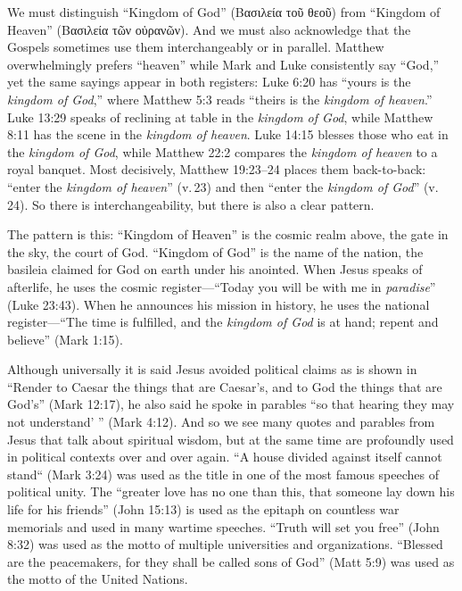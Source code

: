 We must distinguish ``Kingdom of God'' (Βασιλεία τοῦ θεοῦ) from ``Kingdom of Heaven'' (Βασιλεία τῶν οὐρανῶν).
And we must also acknowledge that the Gospels sometimes use them interchangeably or in parallel.
Matthew overwhelmingly prefers ``heaven'' while Mark and Luke consistently say ``God,'' yet the same sayings appear in both registers:
Luke 6:20 has ``yours is the \emph{kingdom of God},'' where Matthew 5:3 reads ``theirs is the \emph{kingdom of heaven}.''
Luke 13:29 speaks of reclining at table in the \emph{kingdom of God}, while Matthew 8:11 has the scene in the \emph{kingdom of heaven}.
Luke 14:15 blesses those who eat in the \emph{kingdom of God}, while Matthew 22:2 compares the \emph{kingdom of heaven} to a royal banquet.
Most decisively, Matthew 19:23--24 places them back-to-back: ``enter the \emph{kingdom of heaven}'' (v.\,23) and then ``enter the \emph{kingdom of God}'' (v.\,24).
So there is interchangeability, but there is also a clear pattern.

The pattern is this: ``Kingdom of Heaven'' is the cosmic realm above, the gate in the sky, the court of God.
``Kingdom of God'' is the name of the nation, the basileia claimed for God on earth under his anointed.
When Jesus speaks of afterlife, he uses the cosmic register---``Today you will be with me in \emph{paradise}'' (Luke 23:43).
When he announces his mission in history, he uses the national register---``The time is fulfilled, and the \emph{kingdom of God} is at hand; repent and believe'' (Mark 1:15).

Although universally it is said Jesus avoided political claims as is shown in ``Render to Caesar the things that are Caesar's, and to God the things that are God's'' (Mark 12:17), he also said he spoke in parables ``so that hearing they may not understand' '' (Mark 4:12).
And so we see many quotes and parables from Jesus that talk about spiritual wisdom, but at the same time are profoundly used in political contexts over and over again.
``A house divided against itself cannot stand`` (Mark 3:24) was used as the title in one of the most famous speeches of political unity.
The ``greater love has no one than this, that someone lay down his life for his friends'' (John 15:13) is used as the epitaph on countless war memorials and used in many wartime speeches.
``Truth will set you free'' (John 8:32) was used as the motto of multiple universities and organizations.
``Blessed are the peacemakers, for they shall be called sons of God'' (Matt 5:9) was used as the motto of the United Nations.

